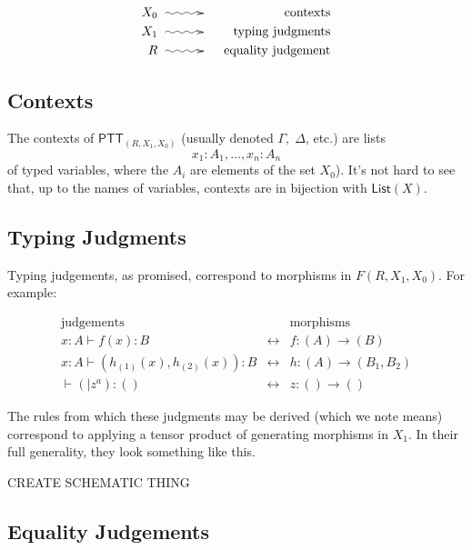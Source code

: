 \documentclass[pra,floatfix,
amsmath,superscriptaddress, 12pt]{article}
\theoremstyle{definition}
\begin{document}
    \begin{eqnarray*}
      X_0
        & \xymatrix@C=3em{{}\ar@{~>}[r]&{}}
            & \mathrm{contexts} \\
      X_1 & \xymatrix@C=3em{{}\ar@{~>}[r]&{}} & \mathrm{typing \ judgments} \\
      R   & \xymatrix@C=3em{{}\ar@{~>}[r]&{}} & \mathrm{equality \ judgement}
    \end{eqnarray*}

\subsection{Contexts}

The contexts of $\mathsf{PTT}_{(R,X_1,X_0)}$ (usually denoted $\Gamma,\;\Delta$, etc.) are lists
    \[
        x_{1}:A_{1},\dots,x_{n}:A_{n}
    \]
of typed variables, where the $A_i$ are elements of the set $X_{0}$). It's not hard to see that, up to the names of variables, contexts are in bijection with $\mathsf{List}(X)$.

\subsection{Typing Judgments}

Typing judgements, as promised, correspond to morphisms in $F(R,X_1,X_0)$. For example:

\begin{eqnarray*}
    \mathrm{judgements}
        &
          &
          \mathrm{morphisms} \\
    x:A\vdash f\left(x\right):B
        &
        \longleftrightarrow
            & f:(A) \longrightarrow (B) \\
    x:A\vdash\left(h_{\left(1\right)}\left(x\right),h_{\left(2\right)}\left(x\right)\right):B
        &
        \longleftrightarrow
            &
            h:(A)\longrightarrow\left(B_{1},B_{2}\right) \\
    \vdash\left(|z^{a}\right):\left(\right)
        &
        \longleftrightarrow
            &
            z:() \longrightarrow ()
\end{eqnarray*}

The rules from which these judgments may be derived (which we note means) correspond to applying a tensor product of generating morphisms in $X_1$. In their full generality, they look something like this.

CREATE SCHEMATIC THING

\subsection{Equality Judgements}
\end{document}
